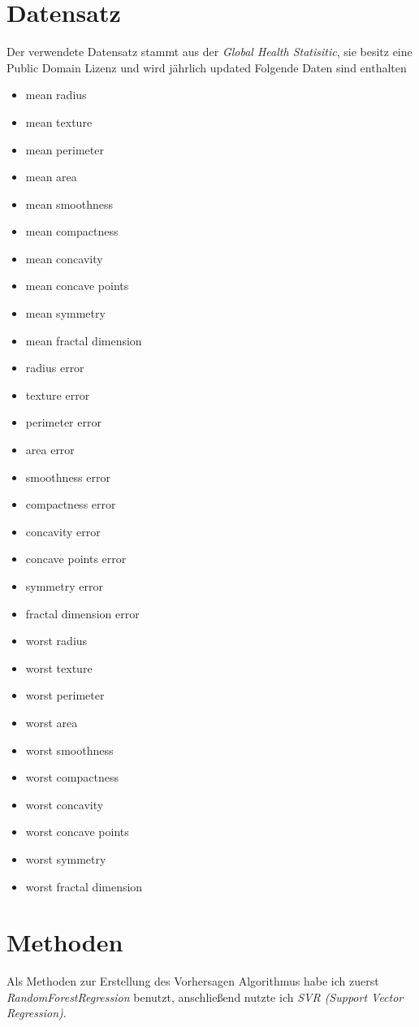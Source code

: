 \documentclass[a4paper,12pt]{article}
\begin{document}
\section{Datensatz}
Der verwendete Datensatz stammt aus der \textit{Global Health Statisitic}, sie besitz eine Public Domain Lizenz und wird jährlich updated\newline
Folgende Daten sind enthalten
\begin{itemize}
    \item mean radius
    \item mean texture
    \item mean perimeter
    \item mean area
    \item mean smoothness
    \item mean compactness
    \item mean concavity
    \item mean concave points
    \item mean symmetry
    \item mean fractal dimension
    \item radius error
    \item texture error
    \item perimeter error
    \item area error
    \item smoothness error
    \item compactness error
    \item concavity error
    \item concave points error
    \item symmetry error
    \item fractal dimension error
    \item worst radius
    \item worst texture
    \item worst perimeter
    \item worst area
    \item worst smoothness
    \item worst compactness
    \item worst concavity
    \item worst concave points
    \item worst symmetry
    \item worst fractal dimension
\end{itemize}



\section{Methoden}
Als Methoden zur Erstellung des Vorhersagen Algorithmus habe ich zuerst \textit{ RandomForestRegression} benutzt, anschließend nutzte ich
\textit{SVR (Support Vector Regression)}.
\end{document}
